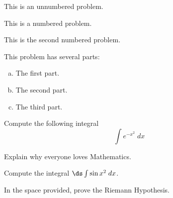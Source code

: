 \documentclass[11pt,letterpaper]{article}
\begin{document}


\prob This is an unnumbered problem. \pspace


\problem This is a numbered problem. \vspace{1.5cm}


\problem This is the second numbered problem. \vfill


\problem This problem has several parts:
	\begin{enumerate}[(a)]
	\item The first part.
	\item The second part. 
	\item The third part. 
	\end{enumerate} \vspace{6cm}



\newpage



\problem Compute the following integral
	\[
	\int e^{-x^2} \;dx
	\] \vspace{3cm}


\problem Explain why everyone loves Mathematics. \pspace


\problem Compute the integral $\ds \int \sin x^2 \;dx$. \vspace{2cm}


\problem In the space provided, prove the Riemann Hypothesis.
\end{document}
